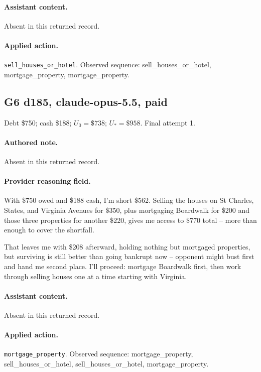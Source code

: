 \paragraph{Assistant content.} Absent in this returned record.

\paragraph{Applied action.} \texttt{sell\_houses\_or\_hotel}. Observed sequence: sell\_houses\_or\_hotel, mortgage\_property, mortgage\_property.

\subsection*{G6 d185, claude-opus-5.5, paid}

\noindent Debt \$750; cash \$188; $U_0=\$738$; $U_*=\$958$. Final attempt 1.\par

\paragraph{Authored note.} Absent in this returned record.

\paragraph{Provider reasoning field.} With \$750 owed and \$188 cash, I'm short \$562. Selling the houses on St Charles, States, and Virginia Avenues for \$350, plus mortgaging Boardwalk for \$200 and those three properties for another \$220, gives me access to \$770 total -- more than enough to cover the shortfall.

That leaves me with \$208 afterward, holding nothing but mortgaged properties, but surviving is still better than going bankrupt now -- opponent might bust first and hand me second place. I'll proceed: mortgage Boardwalk first, then work through selling houses one at a time starting with Virginia.



\paragraph{Assistant content.} Absent in this returned record.

\paragraph{Applied action.} \texttt{mortgage\_property}. Observed sequence: mortgage\_property, sell\_houses\_or\_hotel, sell\_houses\_or\_hotel, mortgage\_property.

